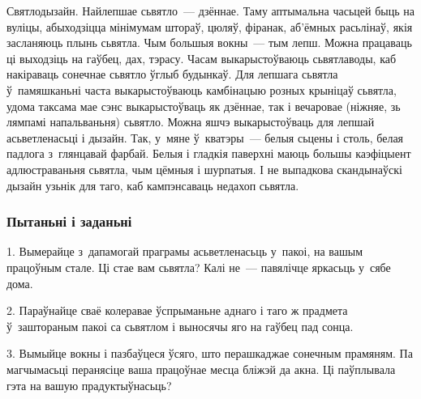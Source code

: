 Святлодызайн. Найлепшае сьвятло~--- дзённае. Таму аптымальна часьцей быць на вуліцы, абыходзіцца мінімумам штораў, цюляў, фіранак, аб'ёмных расьлінаў, якія засланяюць плынь сьвятла. Чым большыя вокны~--- тым лепш. Можна працаваць ці выходзіць на гаўбец, дах, тэрасу. Часам выкарыстоўваюць сьвятлаводы, каб накіраваць сонечнае сьвятло ўглыб будынкаў. Для лепшага сьвятла ў~памяшканьні часта выкарыстоўваюць камбінацыю розных крыніцаў сьвятла, удома таксама мае сэнс выкарыстоўваць як дзённае, так і вечаровае (ніжняе, зь лямпамі напальваньня) сьвятло. Можна яшчэ выкарыстоўваць для лепшай асьветленасьці і дызайн. Так, у~мяне ў~кватэры~--- белыя сьцены і столь, белая падлога з~глянцавай фарбай. Белыя і гладкія паверхні маюць большы каэфіцыент адлюстраваньня сьвятла, чым цёмныя і шурпатыя. І не выпадкова скандынаўскі дызайн узьнік для таго, каб кампэнсаваць недахоп сьвятла.

\subsubsection{Пытаньні і заданьні}

1. Вымерайце з~дапамогай праграмы асьветленасьць у~пакоі, на вашым працоўным стале. Ці стае вам сьвятла? Калі не~--- павялічце яркасьць у~сябе дома.

2. Параўнайце сваё колеравае ўспрыманьне аднаго і таго ж прадмета ў~заштораным пакоі са сьвятлом і выносячы яго на гаўбец пад сонца.

3. Вымыйце вокны і пазбаўцеся ўсяго, што перашкаджае сонечным прамяням. Па магчымасьці перанясіце ваша працоўнае месца бліжэй да акна. Ці паўплывала гэта на вашую прадуктыўнасьць?
